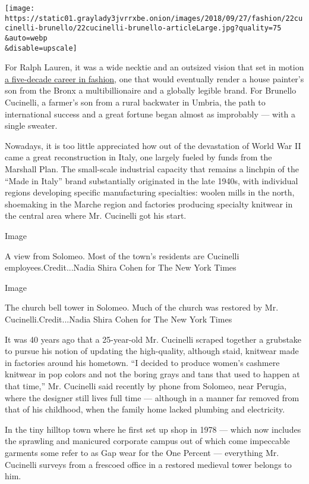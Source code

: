 \texttt{[image: https://static01.graylady3jvrrxbe.onion/images/2018/09/27/fashion/22cucinelli-brunello/22cucinelli-brunello-articleLarge.jpg?quality=75\\\&auto=webp\\\&disable=upscale]}

For Ralph Lauren, it was a wide necktie and an outsized vision that set
in motion
\href{https://www.nytimes3xbfgragh.onion/2018/09/08/fashion/ralph-lauren-50th-anniversary-show.html}{a
five-decade career in fashion}, one that would eventually render a house
painter's son from the Bronx a multibillionaire and a globally legible
brand. For Brunello Cucinelli, a farmer's son from a rural backwater in
Umbria, the path to international success and a great fortune began
almost as improbably --- with a single sweater.

Nowadays, it is too little appreciated how out of the devastation of
World War II came a great reconstruction in Italy, one largely fueled by
funds from the Marshall Plan. The small-scale industrial capacity that
remains a linchpin of the ``Made in Italy'' brand substantially
originated in the late 1940s, with individual regions developing
specific manufacturing specialties: woolen mills in the north,
shoemaking in the Marche region and factories producing specialty
knitwear in the central area where Mr. Cucinelli got his start.

Image

A view from Solomeo. Most of the town's residents are Cucinelli
employees.Credit...Nadia Shira Cohen for The New York Times

Image

The church bell tower in Solomeo. Much of the church was restored by Mr.
Cucinelli.Credit...Nadia Shira Cohen for The New York Times

It was 40 years ago that a 25-year-old Mr. Cucinelli scraped together a
grubstake to pursue his notion of updating the high-quality, although
staid, knitwear made in factories around his hometown. ``I decided to
produce women's cashmere knitwear in pop colors and not the boring grays
and tans that used to happen at that time,'' Mr. Cucinelli said recently
by phone from Solomeo, near Perugia, where the designer still lives full
time --- although in a manner far removed from that of his childhood,
when the family home lacked plumbing and electricity.

In the tiny hilltop town where he first set up shop in 1978 --- which
now includes the sprawling and manicured corporate campus out of which
come impeccable garments some refer to as Gap wear for the One Percent
--- everything Mr. Cucinelli surveys from a frescoed office in a
restored medieval tower belongs to him.

